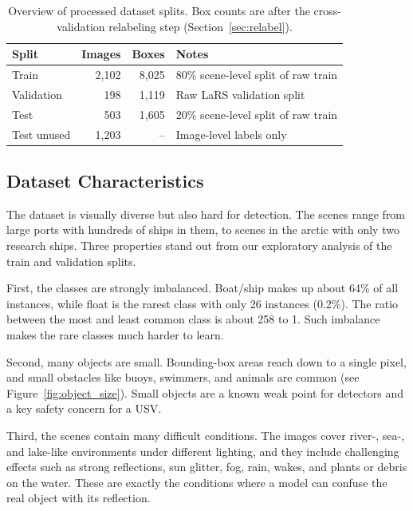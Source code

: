 \documentclass[11pt,a4paper]{article}
\begin{document}
\begin{table}[H]
    \centering
    \caption{Overview of processed dataset splits. Box counts are after the
    cross-validation relabeling step (Section~\ref{sec:relabel}).}
    \label{tab:data_splits}
    \begin{tabular}{lrrl}
        \toprule
        Split & Images & Boxes & Notes \\
        \midrule
        Train & 2,102 & 8,025 & 80\% scene-level split of raw train \\
        Validation & 198 & 1,119 & Raw LaRS validation split \\
        Test & 503 & 1,605 & 20\% scene-level split of raw train \\
        Test unused & 1,203 & -- & Image-level labels only \\
        \bottomrule
    \end{tabular}
\end{table}

\subsection{Dataset Characteristics}
The dataset is visually diverse but also hard for detection. The scenes range from large ports with hundreds of ships in them, to scenes in the arctic with only two research ships. Three properties
stand out from our exploratory analysis of the train and validation splits.

First, the classes are strongly imbalanced. Boat/ship makes up about 64\% of all
instances, while float is the rarest class with only 26 instances (0.2\%). The
ratio between the most and least common class is about 258 to 1. Such imbalance
makes the rare classes much harder to learn.

Second, many objects are small. Bounding-box areas reach down to a single pixel,
and small obstacles like buoys, swimmers, and animals are common (see
Figure~\ref{fig:object_size}). Small objects are a known weak point for detectors
and a key safety concern for a USV.

Third, the scenes contain many difficult conditions. The images cover river-,
sea-, and lake-like environments under different lighting, and they include
challenging effects such as strong reflections, sun glitter, fog, rain, wakes,
and plants or debris on the water. These are exactly the conditions where a
model can confuse the real object with its reflection.
\end{document}
